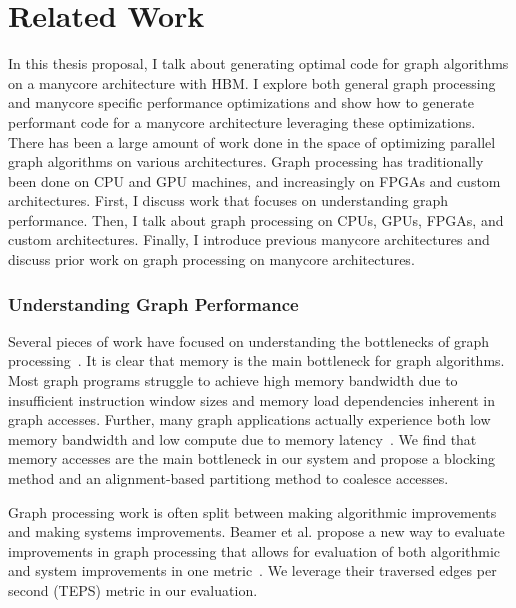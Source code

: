 \chapter{Related Work}\label{gen:sec:relatedwork}


In this thesis proposal, I talk about generating optimal code for graph algorithms on a manycore architecture with HBM. 
I explore both general graph processing and manycore specific performance optimizations and show how to generate performant code for a manycore architecture leveraging these optimizations. 
There has been a large amount of work done in the space of optimizing parallel graph algorithms on various architectures.
Graph processing has traditionally been done on CPU and GPU machines, and increasingly on FPGAs and custom architectures. 
First, I discuss work that focuses on understanding graph performance.
Then, I talk about graph processing on CPUs, GPUs, FPGAs, and custom architectures.
Finally, I introduce previous manycore architectures and discuss prior work on graph processing on manycore architectures.

\subsection{Understanding Graph Performance} Several pieces of work have focused on understanding the bottlenecks of graph processing~\citep{beamer2015locality, basak2019analysis}. It is clear that memory is the main bottleneck for graph algorithms. Most graph programs struggle to achieve high memory bandwidth due to insufficient instruction window sizes and memory load dependencies inherent in graph accesses. Further, many graph applications actually experience both low memory bandwidth and low compute due to memory latency~\cite{beamer2015locality}.
We find that memory accesses are the main bottleneck in our system and propose a blocking method and an alignment-based partitiong method to coalesce accesses.

Graph processing work is often split between making algorithmic improvements and making systems improvements. 
Beamer et al. propose a new way to evaluate improvements in graph processing that allows for evaluation of both algorithmic and system improvements in one metric~\citep{beamer2015gail}.
We leverage their traversed edges per second (TEPS) metric in our evaluation.

